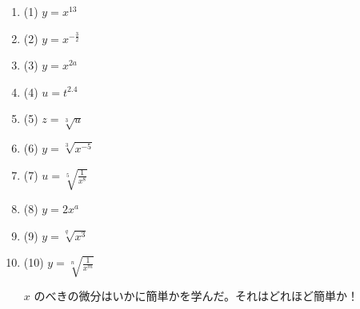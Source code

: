 \documentclass[a4paper,11pt,openany]{ltjsbook}
\begin{document}
\begin{enumerate}
\item (1) $y = x^{13}$
\item (2) $y = x^{-\frac{3}{2}}$


\item (3) $y = x^{2a}$
\item (4) $u = t^{2.4}$


\item (5) $z = \sqrt[3]{u}$
\item (6) $y = \sqrt[3]{x^{-5}}$


\item (7) $u = \sqrt[5]{\frac{1}{x^8}}$
\item (8) $y = 2x^a$ 


\item (9) $y = \sqrt[q]{x^3}$
\item (10) $y = \sqrt[n]{\frac{1}{x^m}}$

$x$ のべきの微分はいかに簡単かを学んだ。それはどれほど簡単か！

\end{enumerate}
\end{document}
